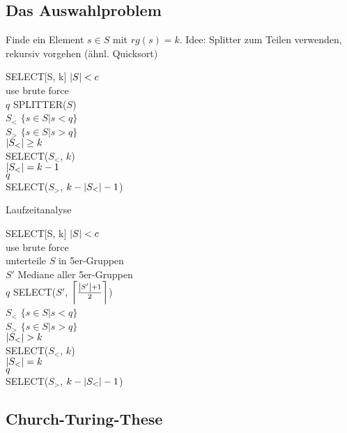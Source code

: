 \subsection{Das Auswahlproblem}

Finde ein Element $s \in S$ mit $rg(s) = k$.
Idee: Splitter zum Teilen verwenden, rekursiv vorgehen (ähnl. Quicksort)

\begin{algorithm}{SELECT}[S, k]{
}
\qif $\left|S\right| < c$\\
	\qthen use brute force\\
	\qelse
		$q$ \qlet SPLITTER($S$)\\
		$S_<$ \qlet $\{s \in S | s < q\}$\\
		$S_>$ \qlet $\{s \in S | s > q\}$\\
		\qif $\left|S_<\right| \geq k$\\
			\qthen \qreturn SELECT($S_<$, $k$)\\
			\qelse
				\qif $\left|S_<\right| = k-1$\\
					\qthen \qreturn $q$\\
					\qelse \qreturn SELECT($S_>$, $k-\left|S_<\right|-1$)
				\qfi
		\qfi
\qfi
\end{algorithm}

Laufzeitanalyse





\begin{algorithm}{SELECT}[S, k]{
}
\qif $\left|S\right| < c$\\
	\qthen use brute force\\
	\qelse
		unterteile $S$ in 5er-Gruppen\\
		$S'$ \qlet Mediane aller 5er-Gruppen\\
		$q$ \qlet SELECT($S'$, $\left\lceil{\frac{\left|S'\right|+1}{2}}\right\rceil$)\\
		$S_<$ \qlet $\{s \in S | s < q\}$\\
		$S_>$ \qlet $\{s \in S | s > q\}$\\
		\qif $\left|S_<\right| > k$\\
			\qthen \qreturn SELECT($S_<$, $k$)\\
			\qelse
				\qif $\left|S_<\right| = k$\\
					\qthen \qreturn $q$\\
					\qelse \qreturn SELECT($S_>$, $k-\left|S_<\right|-1$)
				\qfi
		\qfi
\qfi
\end{algorithm}

\subsection{Church-Turing-These}


